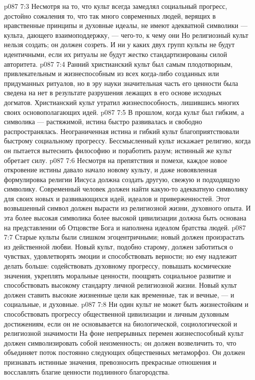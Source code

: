 \vs p087 7:3 Несмотря на то, что культ всегда замедлял социальный прогресс, достойно сожаления то, что так много современных людей, верящих в нравственные принципы и духовные идеалы, не имеют адекватной символики --- культа, дающего взаимоподдержку, --- чего\hyp{}то, к чему они  Но религиозный культ нельзя создать; он должен созреть. И ни у каких двух групп культы не будут идентичными, если их ритуалы не будут жестко стандартизированы силой авторитета.
\vs p087 7:4 Ранний христианский культ был самым плодотворным, привлекательным и жизнеспособным из всех когда\hyp{}либо созданных или придуманных ритуалов, но в эру науки значительная часть его ценности была сведена на нет в результате разрушения лежащих в его основе исходных догматов. Христианский культ утратил жизнеспособность, лишившись многих своих основополагающих идей.
\vs p087 7:5 \pc В прошлом, когда культ был гибким, а символика --- растяжимой, истина быстро развивалась и свободно распространялась. Неограниченная истина и гибкий культ благоприятствовали быстрому социальному прогрессу. Бессмысленный культ искажает религию, когда он пытается вытеснить философию и поработить разум; истинный же культ обретает силу.
\vs p087 7:6 \pc Несмотря на препятствия и помехи, каждое новое откровение истины давало начало новому культу, и даже новоявленная формулировка религии Иисуса должна создать другую, свежую и подходящую символику. Современный человек должен найти какую\hyp{}то адекватную символику для своих новых и развивающихся идей, идеалов и приверженностей. Этот возвышенный символ должен вырасти из религиозной жизни, духовного опыта. И эта более высокая символика более высокой цивилизации должна быть основана на представлении об Отцовстве Бога и наполнена идеалом братства людей.
\vs p087 7:7 Старые культы были слишком эгоцентричными; новый должен произрастать из действенной любви. Новый культ, подобно старому, должен заботиться о чувствах, удовлетворять эмоции и способствовать верности; но ему надлежит делать больше: содействовать духовному прогрессу, повышать космические значения, укреплять моральные ценности, поощрять социальное развитие и способствовать высокому стандарту личной религиозной жизни. Новый культ должен ставить высокие жизненные цели как временные, так и вечные, --- и социальные, и духовные.
\vs p087 7:8 Ни один культ не может быть жизнестойким и способствовать прогрессу общественной цивилизации и личным духовным достижениям, если он не основывается на биологической, социологической и религиозной значимости  На фоне непрерывных перемен жизнеспособный культ должен символизировать собой неизменность; он должен возвеличить то, что объединяет поток постоянно следующих общественных метаморфоз. Он должен признавать истинные значения, превозносить прекрасные отношения и восславлять благие ценности подлинного благородства.
